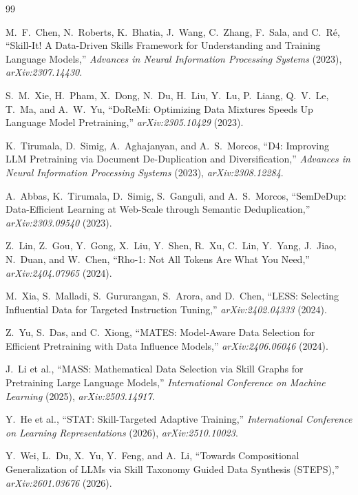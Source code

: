 \documentclass[11pt]{article}
\begin{document}
\begin{thebibliography}{99}
\sloppy

M.~F.~Chen, N.~Roberts, K.~Bhatia, J.~Wang, C.~Zhang, F.~Sala, and C.~R\'e,
``Skill-It! A Data-Driven Skills Framework for Understanding and Training Language Models,''
\emph{Advances in Neural Information Processing Systems} (2023), \emph{arXiv:2307.14430}.

S.~M.~Xie, H.~Pham, X.~Dong, N.~Du, H.~Liu, Y.~Lu, P.~Liang, Q.~V.~Le, T.~Ma, and A.~W.~Yu,
``DoReMi: Optimizing Data Mixtures Speeds Up Language Model Pretraining,''
\emph{arXiv:2305.10429} (2023).

K.~Tirumala, D.~Simig, A.~Aghajanyan, and A.~S.~Morcos,
``D4: Improving LLM Pretraining via Document De-Duplication and Diversification,''
\emph{Advances in Neural Information Processing Systems} (2023), \emph{arXiv:2308.12284}.

A.~Abbas, K.~Tirumala, D.~Simig, S.~Ganguli, and A.~S.~Morcos,
``SemDeDup: Data-Efficient Learning at Web-Scale through Semantic Deduplication,''
\emph{arXiv:2303.09540} (2023).

Z.~Lin, Z.~Gou, Y.~Gong, X.~Liu, Y.~Shen, R.~Xu, C.~Lin, Y.~Yang, J.~Jiao, N.~Duan, and W.~Chen,
``Rho-1: Not All Tokens Are What You Need,''
\emph{arXiv:2404.07965} (2024).

M.~Xia, S.~Malladi, S.~Gururangan, S.~Arora, and D.~Chen,
``LESS: Selecting Influential Data for Targeted Instruction Tuning,''
\emph{arXiv:2402.04333} (2024).

Z.~Yu, S.~Das, and C.~Xiong,
``MATES: Model-Aware Data Selection for Efficient Pretraining with Data Influence Models,''
\emph{arXiv:2406.06046} (2024).

J.~Li et al.,
``MASS: Mathematical Data Selection via Skill Graphs for Pretraining Large Language Models,''
\emph{International Conference on Machine Learning} (2025), \emph{arXiv:2503.14917}.

Y.~He et al.,
``STAT: Skill-Targeted Adaptive Training,''
\emph{International Conference on Learning Representations} (2026), \emph{arXiv:2510.10023}.

Y.~Wei, L.~Du, X.~Yu, Y.~Feng, and A.~Li,
``Towards Compositional Generalization of LLMs via Skill Taxonomy Guided Data Synthesis (STEPS),''
\emph{arXiv:2601.03676} (2026).


\end{thebibliography}
\end{document}
